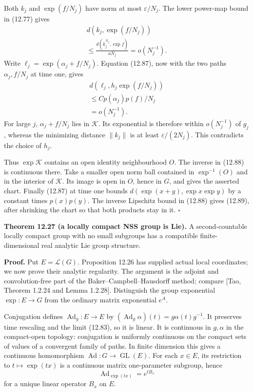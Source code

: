 \documentclass[
  11pt,
]{article}
\begin{document}
Both \(k_j\) and \(\exp(f/N_j)\) have norm at most \(\varepsilon/N_j\).
The lower power-map bound in (12.77) gives \[
\begin{gathered}
d(k_j,\exp(f/N_j))\\
\leq\frac{d(k_j^{N_j},\exp f)}{aN_j}
=o(N_j^{-1}).
\end{gathered}
\tag{12.93}
\] Write \(\ell_j=\exp(\alpha_j+f/N_j)\). Equation (12.87), now with the
two paths \(\alpha_j,f/N_j\) at time one, gives \[
\begin{gathered}
d(\ell_j,h_j\exp(f/N_j))\\
\leq C p(\alpha_j)p(f)/N_j\\
=o(N_j^{-1}).
\end{gathered}
\tag{12.93a}
\] For large \(j\), \(\alpha_j+f/N_j\) lies in \(\mathcal K\). Its
exponential is therefore within \(o(N_j^{-1})\) of \(g_j\), whereas the
minimizing distance \(\|k_j\|\) is at least \(\varepsilon/(2N_j)\). This
contradicts the choice of \(h_j\).

Thus \(\exp\mathcal K\) contains an open identity neighbourhood \(O\).
The inverse in (12.88) is continuous there. Take a smaller open norm
ball contained in \(\exp^{-1}(O)\) and in the interior of
\(\mathcal K\). Its image is open in \(O\), hence in \(G\), and gives
the asserted chart. Finally (12.87) at time one bounds
\(d(\exp(x+y),\exp x\exp y)\) by a constant times \(p(x)p(y)\). The
inverse Lipschitz bound in (12.88) gives (12.89), after shrinking the
chart so that both products stay in it. \(\square\)

\textbf{Theorem 12.27 (a locally compact NSS group is Lie).} A
second-countable locally compact group with no small subgroups has a
compatible finite-dimensional real analytic Lie group structure.

\textbf{Proof.} Put \(E=\mathcal L(G)\). Proposition 12.26 has supplied
actual local coordinates; we now prove their analytic regularity. The
argument is the adjoint and convolution-free part of the
Baker--Campbell--Hausdorff method; compare {[}Tao, Theorem 1.2.24 and
Lemma 1.2.28{]}. Distinguish the group exponential \(\exp:E\to G\) from
the ordinary matrix exponential \(e^A\).

Conjugation defines \(\operatorname{Ad}_g:E\to E\) by
\((\operatorname{Ad}_g\alpha)(t)=g\alpha(t)g^{-1}\). It preserves time
rescaling and the limit (12.83), so it is linear. It is continuous in
\(g,\alpha\) in the compact-open topology: conjugation is uniformly
continuous on the compact sets of values of a convergent family of
paths. In finite dimension this gives a continuous homomorphism
\(\operatorname{Ad}:G\to\operatorname{GL}(E)\). For each \(x\in E\), its
restriction to \(t\mapsto\exp(tx)\) is a continuous matrix one-parameter
subgroup, hence \[
\operatorname{Ad}_{\exp(tx)}=e^{tB_x}
\tag{12.94}
\] for a unique linear operator \(B_x\) on \(E\).
\end{document}
